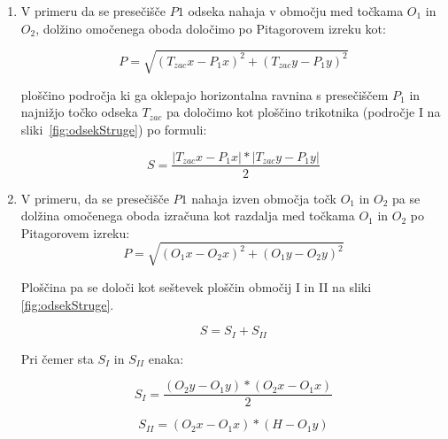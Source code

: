 \begin{enumerate}
	\item V primeru da se presečišče $P1$ odseka nahaja v območju med točkama $O_1$ in $O_2$, dolžino omočenega oboda določimo po Pitagorovem izreku kot:
	
	
	\begin{ceqn}
		\begin{equation}
		P = \sqrt{(T_{zac}x - P_1x)^{2} + (T_{zac}y - P_1y)^{2}}
		\end{equation}
	\end{ceqn}
	
	
	ploščino področja ki ga oklepajo horizontalna ravnina s presečiščem $P_1$ in najnižjo točko odseka $T_{zac}$ pa določimo kot ploščino trikotnika (področje I na sliki~\ref{fig:odsekStruge}) po formuli:
	
	\begin{equation}
	S = \dfrac{|T_{zac}x - P_1x| * |T_{zac}y - P_1y|}{2}
	\end{equation}
	
	
	\item V primeru, da se presečišče $P1$ nahaja izven območja točk $O_1$ in $O_2$ pa se dolžina omočenega oboda izračuna kot razdalja med točkama $O_1$ in $O_2$ po Pitagorovem izreku:
	\begin{equation}
	P = \sqrt{ (O_1x - O_2x)^{2} + (O_1y - O_2y)^{2}}
	\end{equation}
	
	Ploščina pa se določi kot seštevek ploščin območij I in II na sliki \ref{fig:odsekStruge}.
	
	\begin{equation}
	S = S_I + S_{II}
	\end{equation}
	
	Pri čemer sta $S_I$ in $S_{II}$ enaka:
	
	\begin{equation}
	S_I =\dfrac{ (O_2y - O_1y) *  (O_2x - O_1x)}{2}
	\end{equation}
	
	\begin{equation}
	S_{II} = (O_2x - O_1x) * (H - O_1y)
	\end{equation}
	
	
	
	
	
\end{enumerate}



